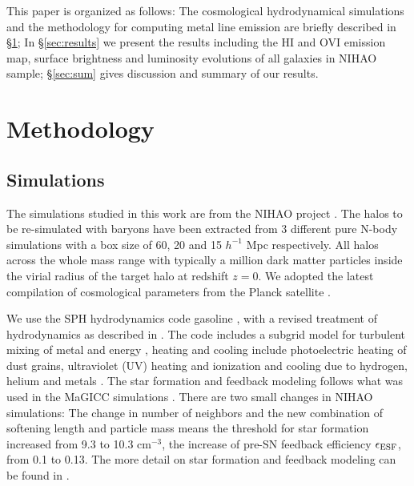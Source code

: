 \documentclass[useAMS,usenatbib]{mn2e}
\def \ion#1#2{#1{\footnotesize{#2}}\relax}
\def \hi       {\ion{H}{I}}
\def \ovi      {\ion{O}{VI}}
\begin{document}
This paper is organized as follows: The cosmological hydrodynamical
simulations and the methodology for computing metal line emission
are briefly described in  \S\ref{sec:method}; In \S\ref{sec:results} 
we present the results including the \hi{} and \ovi{} emission map,
surface brightness and luminosity evolutions of all galaxies in NIHAO
sample; \S\ref{sec:sum} gives discussion and  summary of our
results.




\section{Methodology} 
\label{sec:method}

\subsection{Simulations}
\label{sec:sims}

The simulations studied in this work are from the NIHAO project \citep{Wang15}.  
The halos to be re-simulated with baryons have been extracted from 
3 different pure N-body simulations with a box size of 60, 20 and 
15 $h^{-1}$ Mpc respectively\citet{Dutton14}. 
All halos across the whole mass range with typically a million dark
matter particles inside the virial radius of the target halo at 
redshift $z=0$.  
We adopted the  latest compilation of cosmological
parameters from the Planck  satellite \citep{Planck14}. 

We use the SPH hydrodynamics code {\sc gasoline} \citep{Wadsley04},
with a revised treatment of  hydrodynamics as described in
\citet{Keller14}.  The code includes a subgrid model for turbulent
mixing of metal and energy \citep{Wadsley08}, heating and cooling
include photoelectric heating of dust grains, ultraviolet (UV) heating
and ionization and  cooling due to hydrogen, helium and metals
\citep{Shen10}.  The star formation and feedback modeling follows what
was used in the MaGICC simulations \citep{Stinson13}.  There are two
small changes in NIHAO simulations: The change in  number of neighbors
and the new combination of softening length and  particle mass means
the threshold for star formation increased from  9.3 to 10.3
cm$^{-3}$, the increase of pre-SN feedback efficiency $\epsilon_{\rm
  ESF}$, from 0.1 to 0.13.  The more detail on star formation and
feedback modeling can be found in \citet{Wang15}.
\end{document}
